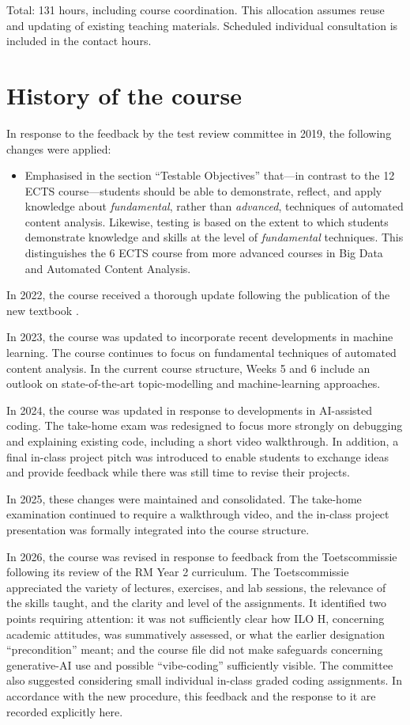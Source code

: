 \documentclass[a4paper,12pt]{report}
\begin{document}
Total: 131 hours, including course coordination. This allocation assumes reuse and updating of existing teaching materials. Scheduled individual consultation is included in the contact hours.

\chapter{History of the course}

In response to the feedback by the test review committee in 2019, the following changes were applied:
\begin{itemize}
    \item Emphasised in the section ``Testable Objectives'' that---in contrast to the 12 ECTS course---students should be able to demonstrate, reflect, and apply knowledge about \emph{fundamental}, rather than \emph{advanced}, techniques of automated content analysis. Likewise, testing is based on the extent to which students demonstrate knowledge and skills at the level of \emph{fundamental} techniques. This distinguishes the 6 ECTS course from more advanced courses in Big Data and Automated Content Analysis.
\end{itemize}

In 2022, the course received a thorough update following the publication of the new textbook \citep{cssbook}.

In 2023, the course was updated to incorporate recent developments in machine learning. The course continues to focus on fundamental techniques of automated content analysis. In the current course structure, Weeks 5 and 6 include an outlook on state-of-the-art topic-modelling and machine-learning approaches.

In 2024, the course was updated in response to developments in AI-assisted coding. The take-home exam was redesigned to focus more strongly on debugging and explaining existing code, including a short video walkthrough. In addition, a final in-class project pitch was introduced to enable students to exchange ideas and provide feedback while there was still time to revise their projects.

In 2025, these changes were maintained and consolidated. The take-home examination continued to require a walkthrough video, and the in-class project presentation was formally integrated into the course structure.

In 2026, the course was revised in response to feedback from the Toetscommissie following its review of the RM Year 2 curriculum. The Toetscommissie appreciated the variety of lectures, exercises, and lab sessions, the relevance of the skills taught, and the clarity and level of the assignments. It identified two points requiring attention: it was not sufficiently clear how ILO H, concerning academic attitudes, was summatively assessed, or what the earlier designation ``precondition'' meant; and the course file did not make safeguards concerning generative-AI use and possible ``vibe-coding'' sufficiently visible. The committee also suggested considering small individual in-class graded coding assignments. In accordance with the new procedure, this feedback and the response to it are recorded explicitly here.
\end{document}

